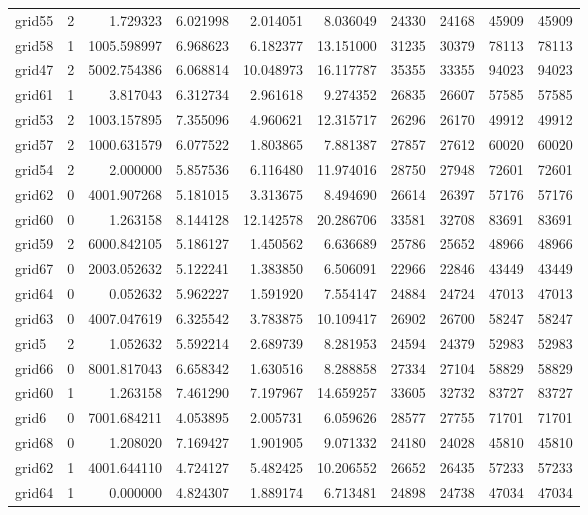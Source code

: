 \begin{longtable}{|l|r|r|r|r|r|r|r|r|r|}
grid55 & 2 & 1.729323 & 6.021998 & 2.014051 & 8.036049 & 24330 & 24168 & 45909 & 45909 \\
grid58 & 1 & 1005.598997 & 6.968623 & 6.182377 & 13.151000 & 31235 & 30379 & 78113 & 78113 \\
grid47 & 2 & 5002.754386 & 6.068814 & 10.048973 & 16.117787 & 35355 & 33355 & 94023 & 94023 \\
grid61 & 1 & 3.817043 & 6.312734 & 2.961618 & 9.274352 & 26835 & 26607 & 57585 & 57585 \\
grid53 & 2 & 1003.157895 & 7.355096 & 4.960621 & 12.315717 & 26296 & 26170 & 49912 & 49912 \\
grid57 & 2 & 1000.631579 & 6.077522 & 1.803865 & 7.881387 & 27857 & 27612 & 60020 & 60020 \\
grid54 & 2 & 2.000000 & 5.857536 & 6.116480 & 11.974016 & 28750 & 27948 & 72601 & 72601 \\
grid62 & 0 & 4001.907268 & 5.181015 & 3.313675 & 8.494690 & 26614 & 26397 & 57176 & 57176 \\
grid60 & 0 & 1.263158 & 8.144128 & 12.142578 & 20.286706 & 33581 & 32708 & 83691 & 83691 \\
grid59 & 2 & 6000.842105 & 5.186127 & 1.450562 & 6.636689 & 25786 & 25652 & 48966 & 48966 \\
grid67 & 0 & 2003.052632 & 5.122241 & 1.383850 & 6.506091 & 22966 & 22846 & 43449 & 43449 \\
grid64 & 0 & 0.052632 & 5.962227 & 1.591920 & 7.554147 & 24884 & 24724 & 47013 & 47013 \\
grid63 & 0 & 4007.047619 & 6.325542 & 3.783875 & 10.109417 & 26902 & 26700 & 58247 & 58247 \\
grid5 & 2 & 1.052632 & 5.592214 & 2.689739 & 8.281953 & 24594 & 24379 & 52983 & 52983 \\
grid66 & 0 & 8001.817043 & 6.658342 & 1.630516 & 8.288858 & 27334 & 27104 & 58829 & 58829 \\
grid60 & 1 & 1.263158 & 7.461290 & 7.197967 & 14.659257 & 33605 & 32732 & 83727 & 83727 \\
grid6 & 0 & 7001.684211 & 4.053895 & 2.005731 & 6.059626 & 28577 & 27755 & 71701 & 71701 \\
grid68 & 0 & 1.208020 & 7.169427 & 1.901905 & 9.071332 & 24180 & 24028 & 45810 & 45810 \\
grid62 & 1 & 4001.644110 & 4.724127 & 5.482425 & 10.206552 & 26652 & 26435 & 57233 & 57233 \\
grid64 & 1 & 0.000000 & 4.824307 & 1.889174 & 6.713481 & 24898 & 24738 & 47034 & 47034 \\

\end{longtable}

